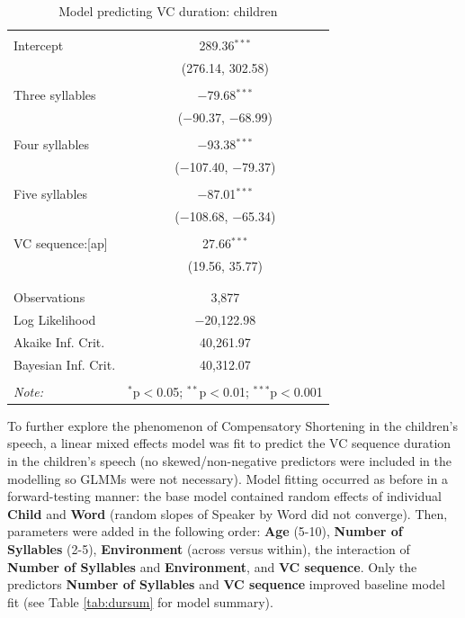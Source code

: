 \documentclass[
]{article}
\begin{document}
\begin{table}[!htbp] \centering 
  \caption{Model predicting VC duration: children} 
  \label{} 
\begin{tabular}{@{\extracolsep{5pt}}lc} 
\\[-1.8ex]\hline 
\hline \\[-1.8ex] 
 Intercept & 289.36$^{***}$ \\ 
  & (276.14, 302.58) \\ 
  & \\ 
 Three syllables & $-$79.68$^{***}$ \\ 
  & ($-$90.37, $-$68.99) \\ 
  & \\ 
 Four syllables & $-$93.38$^{***}$ \\ 
  & ($-$107.40, $-$79.37) \\ 
  & \\ 
 Five syllables & $-$87.01$^{***}$ \\ 
  & ($-$108.68, $-$65.34) \\ 
  & \\ 
 VC sequence:[ap] & 27.66$^{***}$ \\ 
  & (19.56, 35.77) \\ 
  & \\ 
\hline \\[-1.8ex] 
Observations & 3,877 \\ 
Log Likelihood & $-$20,122.98 \\ 
Akaike Inf. Crit. & 40,261.97 \\ 
Bayesian Inf. Crit. & 40,312.07 \\ 
\hline 
\hline \\[-1.8ex] 
\textit{Note:}  & \multicolumn{1}{r}{$^{*}$p$<$0.05; $^{**}$p$<$0.01; $^{***}$p$<$0.001} \\ 
\end{tabular} 
\end{table}

To further explore the phenomenon of Compensatory Shortening in the children's speech, a linear mixed effects model was fit to predict the VC sequence duration in the children's speech (no skewed/non-negative predictors were included in the modelling so GLMMs were not necessary). Model fitting occurred as before in a forward-testing manner: the base model contained random effects of individual \textbf{Child} and \textbf{Word} (random slopes of Speaker by Word did not converge). Then, parameters were added in the following order: \textbf{Age} (5-10), \textbf{Number of Syllables} (2-5), \textbf{Environment} (across versus within), the interaction of \textbf{Number of Syllables} and \textbf{Environment}, and \textbf{VC sequence}. Only the predictors \textbf{Number of Syllables} and \textbf{VC sequence} improved baseline model fit (see Table \ref{tab:dursum} for model summary).
\end{document}
